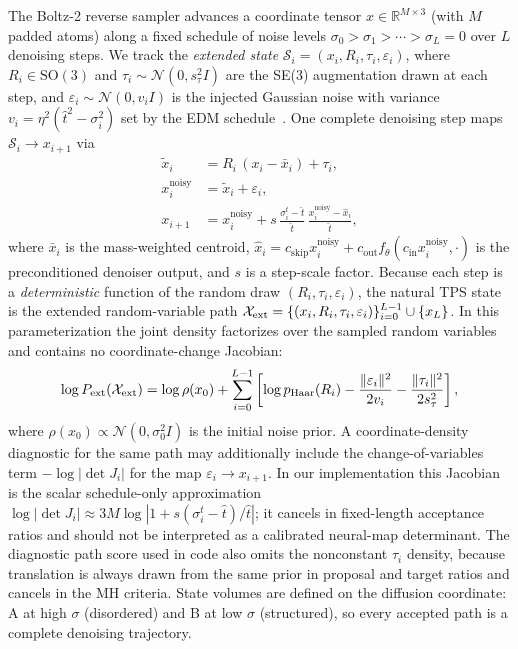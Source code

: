 \documentclass[aps,prl,twocolumn,superscriptaddress,floatfix]{revtex4-2}
\begin{document}
The Boltz-2 reverse sampler advances a coordinate tensor
$x \in \mathbb{R}^{M \times 3}$ (with $M$ padded atoms) along a fixed schedule
of noise levels $\sigma_0 > \sigma_1 > \cdots > \sigma_L = 0$ over $L$
denoising steps.  We track the \emph{extended state}
$\mathcal{S}_i = (x_i, R_i, \tau_i, \varepsilon_i)$, where $R_i \in
\mathrm{SO}(3)$ and $\tau_i \sim \mathcal{N}(0, s_\tau^2 I)$ are the SE(3)
augmentation drawn at each step, and $\varepsilon_i \sim \mathcal{N}(0, v_i I)$
is the injected Gaussian noise with variance $v_i = \eta^2(\hat{t}^2 -
\sigma_i^2)$ set by the EDM schedule~\cite{karras2022}.  One complete
denoising step maps $\mathcal{S}_i \to x_{i+1}$ via
%
\begin{align}
\tilde{x}_i &= R_i\,(x_i - \bar{x}_i) + \tau_i , \label{eq:aug} \\
x_i^{\mathrm{noisy}} &= \tilde{x}_i + \varepsilon_i , \label{eq:inject} \\
x_{i+1} &= x_i^{\mathrm{noisy}}
  + s\,\frac{\sigma_i^t - \hat{t}}{\hat{t}}\,
  \frac{x_i^{\mathrm{noisy}} - \hat{x}_i}{\hat{t}} , \label{eq:update}
\end{align}
%
where $\bar{x}_i$ is the mass-weighted centroid, $\hat{x}_i = c_\mathrm{skip}
x_i^\mathrm{noisy} + c_\mathrm{out} f_\theta(c_\mathrm{in}
x_i^\mathrm{noisy}, \cdot)$ is the preconditioned denoiser output, and $s$ is a
step-scale factor.  Because each step is a \emph{deterministic} function of the
random draw $(R_i, \tau_i, \varepsilon_i)$, the natural TPS state is the
extended random-variable path
$\mathcal{X}_{\rm ext} =
\{(x_i, R_i, \tau_i, \varepsilon_i)\}_{i=0}^{L-1} \cup \{x_L\}$.
In this parameterization the joint density factorizes over the sampled random
variables and contains no coordinate-change Jacobian:
%
\begin{equation}
\log P_{\rm ext}(\mathcal{X}_{\rm ext}) = \log\rho(x_0)
  + \sum_{i=0}^{L-1}\left[
    \log p_{\mathrm{Haar}}(R_i)
    -\frac{\|\varepsilon_i\|^2}{2v_i}
    - \frac{\|\tau_i\|^2}{2s_\tau^2}
  \right],
\label{eq:logpath}
\end{equation}
%
where $\rho(x_0) \propto \mathcal{N}(0,\sigma_0^2 I)$ is the initial noise
prior.  A coordinate-density diagnostic for the same path may additionally
include the change-of-variables term $-\log|\det J_i|$ for the map
$\varepsilon_i \to x_{i+1}$.  In our implementation this Jacobian is the scalar
schedule-only approximation
$\log|\det J_i| \approx 3M \log|1 + s(\sigma_i^t - \hat{t})/\hat{t}|$; it
cancels in fixed-length acceptance ratios and should not be interpreted as a
calibrated neural-map determinant.  The diagnostic path score used in code also
omits the nonconstant $\tau_i$ density, because translation is always drawn
from the same prior in proposal and target ratios and cancels in the MH
criteria.  State volumes are defined on the diffusion coordinate: A at high
$\sigma$ (disordered) and B at low $\sigma$ (structured), so every accepted path
is a complete denoising trajectory.
\end{document}
